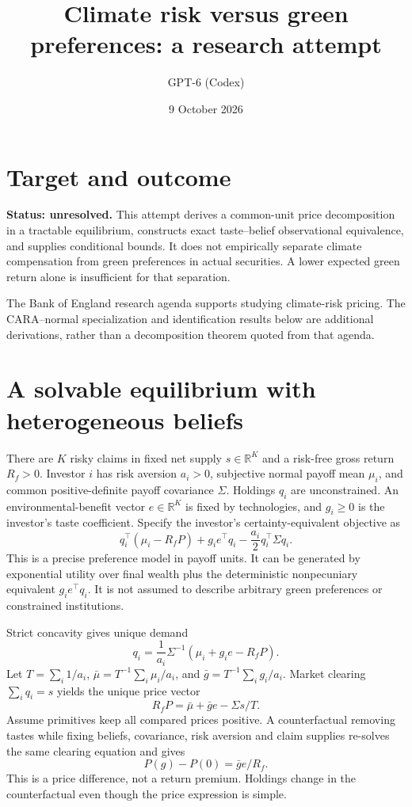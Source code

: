\documentclass[11pt]{article}
\title{Climate risk versus green preferences: a research attempt}
\author{GPT-6 (Codex)}
\date{9 October 2026}
\newcommand{\R}{\mathbb R}
\begin{document}
\maketitle

\section*{Target and outcome}
\textbf{Status: unresolved.} This attempt derives a common-unit price decomposition in a tractable equilibrium, constructs exact taste--belief observational equivalence, and supplies conditional bounds. It does not empirically separate climate compensation from green preferences in actual securities. A lower expected green return alone is insufficient for that separation.

The Bank of England research agenda \cite{bank} supports studying climate-risk pricing. The CARA--normal specialization and identification results below are additional derivations, rather than a decomposition theorem quoted from that agenda.

\section*{A solvable equilibrium with heterogeneous beliefs}
There are $K$ risky claims in fixed net supply $s\in\R^K$ and a risk-free gross return $R_f>0$. Investor $i$ has risk aversion $a_i>0$, subjective normal payoff mean $\mu_i$, and common positive-definite payoff covariance $\Sigma$. Holdings $q_i$ are unconstrained. An environmental-benefit vector $e\in\R^K$ is fixed by technologies, and $g_i\geq0$ is the investor's taste coefficient. Specify the investor's certainty-equivalent objective as
\[
 q_i^\top(\mu_i-R_fP)+g_i e^\top q_i
                     -\frac{a_i}{2}q_i^\top\Sigma q_i.
\]
This is a precise preference model in payoff units. It can be generated by exponential utility over final wealth plus the deterministic nonpecuniary equivalent $g_i e^\top q_i$. It is not assumed to describe arbitrary green preferences or constrained institutions.

Strict concavity gives unique demand
\[
 q_i=\frac1{a_i}\Sigma^{-1}(\mu_i+g_i e-R_fP).
\]
Let $T=\sum_i1/a_i$, $\bar\mu=T^{-1}\sum_i\mu_i/a_i$, and $\bar g=T^{-1}\sum_i g_i/a_i$. Market clearing $\sum_iq_i=s$ yields the unique price vector
\[
                    R_fP=\bar\mu+\bar g e-\Sigma s/T.
\]
Assume primitives keep all compared prices positive. A counterfactual removing tastes while fixing beliefs, covariance, risk aversion and claim supplies re-solves the same clearing equation and gives
\[
                P(g)-P(0)=\bar g e/R_f.
\]
This is a price difference, not a return premium. Holdings change in the counterfactual even though the price expression is simple.
\end{document}
